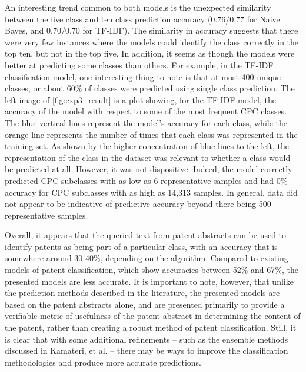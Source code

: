 \documentclass{article}
\begin{document}
An interesting trend common to both models is the unexpected similarity between the five class and ten class prediction accuracy (0.76/0.77 for Naive Bayes, and 0.70/0.70 for TF-IDF).  The similarity in accuracy suggests that there were very few instances where the models could identify the class correctly in the top ten, but not in the top five. In addition, it seems as though the models were better at predicting some classes than others.   For example, in the TF-IDF classification model, one interesting thing to note is that at most 400 unique classes, or about 60\% of classes were predicted using single class prediction. The left image of \autoref{fig:exp3_result} is a plot showing, for the TF-IDF model, the accuracy of the model with respect to some of the most frequent CPC classes.  The blue vertical lines represent the model’s accuracy for each class, while the orange line represents the number of times that each class was represented in the training set. As shown by the higher concentration of blue lines to the left, the representation of the class in the dataset was relevant to whether a class would be predicted at all.  However, it was not dispositive.  Indeed, the model correctly predicted CPC subclasses with as low as 6 representative samples and had 0\% accuracy for CPC subclasses with as high as 14,313 samples.  In general, data did not appear to be indicative of predictive accuracy beyond there being 500 representative samples. 

Overall, it appears that the queried text from patent abstracts can be used to identify patents as being part of a particular class, with an accuracy that is somewhere around 30-40\%, depending on the algorithm.  Compared to existing models of patent classification, which show accuracies between 52\% and 67\%\cite{article:kamateri}, the presented models are less accurate.  It is important to note, however, that unlike the prediction methods described in the literature, the presented models are based on the patent abstracts alone, and are presented primarily to provide a verifiable metric of usefulness of the patent abstract in determining the content of the patent, rather than creating a robust method of patent classification.  Still, it is clear that with some additional refinements – such as the ensemble methods discussed in Kamateri, et al. – there may be ways to improve the classification methodologies and produce more accurate predictions.
\end{document}
